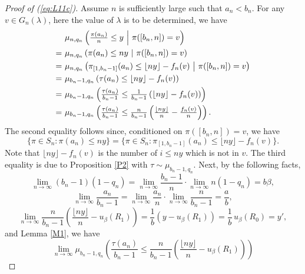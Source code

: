 \begin{proof}[Proof of (\ref{eq:L11c})]
Assume $n$ is sufficiently large such that $a_n < b_n$. For any $v \in G_n(\lambda)$, here the value of $\lambda$ is to be determined, we have
\begin{align}
& \textstyle\n \left( \frac{\pi(a_n)}{n} \le y \ \middle|\  \pi([b_n, n]) = v \right) \label{eq:L11d}\\
 =\ & \n \left( \pi(a_n) \le n y \ \middle|\ \pi([b_n, n]) = v \right) \nonumber\\
 =\ & \n \left( \pi_{[1, b_n -1]} (a_n) \le \lfloor n y \rfloor - f_n(v) \ \middle|\ \pi([b_n, n]) = v \right) \nonumber\\
 =\ & \mu_{b_n -1, q_n} \left( \tau(a_n) \le \lfloor n y \rfloor - f_n(v) \right) \nonumber\\
 =\ & \mu_{b_n -1, q_n} \textstyle\left( \frac{\tau(a_n)}{b_n -1} \le \frac{1}{b_n -1} \left( \lfloor n y \rfloor - f_n(v) \right) \right) \nonumber\\
 =\ & \mu_{b_n -1, q_n} \textstyle\left( \frac{\tau(a_n)}{b_n -1} \le
  \frac{n}{b_n -1} \left( \frac{\lfloor n y \rfloor}{n} - \frac{f_n(v)}{n} \right) \right). \nonumber
\end{align}
The second equality follows since, conditioned on $\pi([b_n, n]) = v$, we have
\[
\{ \pi \in S_n : \pi(a_n) \le n y \}
= \{ \pi \in S_n : \pi_{[1, b_n -1]} (a_n) \le \lfloor n y \rfloor - f_n(v) \}.
\]
Note that $\lfloor n y \rfloor - f_n(v)$ is the number of $i \le n y$ which is not in $v$.
The third equality is due to Proposition \ref{P2} with $\tau \sim \mu_{b_n -1, q_n}$. Next, by the following facts,
\begin{equation}\label{eq:L11D}
\lim_{n \to \infty} (b_n -1)(1-q_n) = \lim_{n \to \infty}\textstyle\frac{b_n -1}{n}\cdot\lim_{n \to \infty}n (1-q_n) = b \beta,
\end{equation}
\vspace{-4mm}
\begin{equation}
\lim_{n \to \infty} \frac{a_n}{b_n-1} = \lim_{n \to \infty} \frac{a_n}{n}\cdot\lim_{n \to \infty}\frac{n}{b_n -1} = \frac{a}{b},
\end{equation}
\begin{equation}\label{eq:L11e}
\lim_{n \to \infty} \frac{n}{b_n -1} \left( \frac{\lfloor n y \rfloor}{n} - u_{\beta}(R_1) \right)
= \frac{1}{b}(y - u_{\beta}(R_1)) = \frac{1}{b}\, u_{\beta}(R_0) = y', 
\end{equation}
and Lemma \ref{M1}, we have
\[
\lim_{n \to \infty} \textstyle\mu_{b_n -1, q_n} \left( \frac{\tau(a_n)}{b_n -1} \le \frac{n}{b_n -1} \left( \frac{\lfloor n y \rfloor}{n} - u_{\beta}(R_1) \right) \right)
\]
\end{proof}
